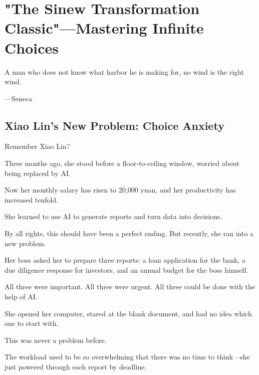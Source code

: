 
\chapter{"The Sinew Transformation Classic"---Mastering Infinite Choices}

\begin{myquote}

A man who does not know what harbor he is making for, no wind is the right wind.

\hfill ---Seneca
\end{myquote}

\section{Xiao Lin's New Problem: Choice Anxiety}

Remember Xiao Lin?

Three months ago, she stood before a floor-to-ceiling window, worried about being replaced by AI.

Now her monthly salary has risen to 20,000 yuan, and her productivity has increased tenfold.

She learned to use AI to generate reports and turn data into decisions.

By all rights, this should have been a perfect ending. But recently, she ran into a new problem.

\vspace{1em}

Her boss asked her to prepare three reports: a loan application for the bank, a due diligence response for investors, and an annual budget for the boss himself.

All three were important. All three were urgent. All three could be done with the help of AI.

She opened her computer, stared at the blank document, and had no idea which one to start with.

\vspace{1em}

This was never a problem before.

The workload used to be so overwhelming that there was no time to think---she just powered through each report by deadline.


